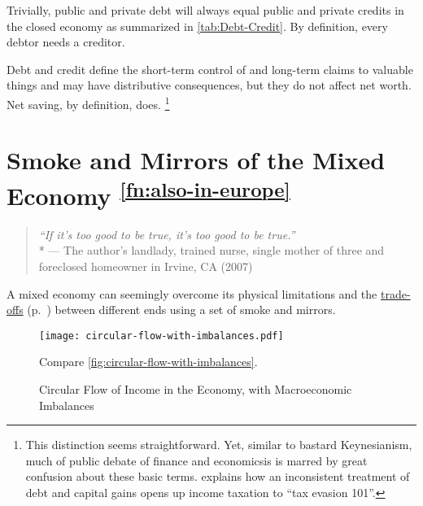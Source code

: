 \begin{enumerate}
	Trivially, public and private debt will always equal public and private credits in the closed economy as summarized in \autoref{tab:Debt-Credit}.
	By definition, every debtor needs a creditor.

	Debt and credit define the short-term control of and long-term claims to valuable things and may have distributive consequences, but they do not affect net worth.
	Net saving, by definition, does.
	\footnote{
		This distinction seems straightforward.
		Yet, similar to bastard Keynesianism, much of public debate of finance and economicsis is marred by great confusion about these basic terms.
		\citealt{McCaffery2005} explains how an inconsistent treatment of debt and capital gains opens up income taxation to ``tax evasion 101''.
	}
\end{enumerate}

\section[Smoke \& Mirrors]{Smoke and Mirrors of the Mixed Economy \textsuperscript{\ref{fn:also-in-europe}}}
	\label{sec:smoke-n-mirrors}

\begin{quote}
	\emph{``If it's too good to be true, it's too good to be true.''}
	\\*
	--- The author's landlady, trained nurse, single mother of three and foreclosed homeowner in Irvine, CA (2007)
\end{quote}


A mixed economy can seemingly overcome its physical limitations and the \hyperref[sec:trade-offs]{trade-offs} (p.~\pageref{sec:trade-offs}) between different ends using a set of smoke and mirrors.

\begin{figure}[htbp]
	\centering
	\texttt{[image: circular-flow-with-imbalances.pdf]}
	\caption[Circular Flow in the Economy, with Imbalances]{Circular Flow of Income in the Economy, with Macroeconomic Imbalances}
	\begin{flushleft}
		\scriptsize{Compare \autoref{fig:circular-flow-with-imbalances}.}
	\end{flushleft}
	\label{fig:circular-flow-with-imbalances}
\end{figure}

